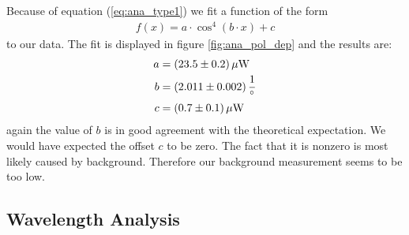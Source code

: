 \documentclass{protokoll_en}
\begin{document}
Because of equation (\ref{eq:ana_type1}) we fit a function of the form
\begin{align*}
f(x) = a\cdotp \cos^4(b\cdotp x)+c
\end{align*}
to our data. The fit is displayed in figure \ref{fig:ana_pol_dep} and the results are:
\begin{align}
a &= \unit[(23.5 \pm 0.2)]{\mu W}\\
\notag b &= \unit[(2.011 \pm 0.002)]{\frac{1}{^\circ}}\\
\notag c &= \unit[(0.7 \pm 0.1)]{\mu W}
\end{align}
again the value of $b$ is in good agreement with the theoretical expectation. We would have expected the offset $c$ to be zero. The fact that it is nonzero is most likely caused by background. Therefore our background measurement seems to be too low.

\subsection{Wavelength Analysis}
\label{subsec:ana_wavelengths}
\end{document}
